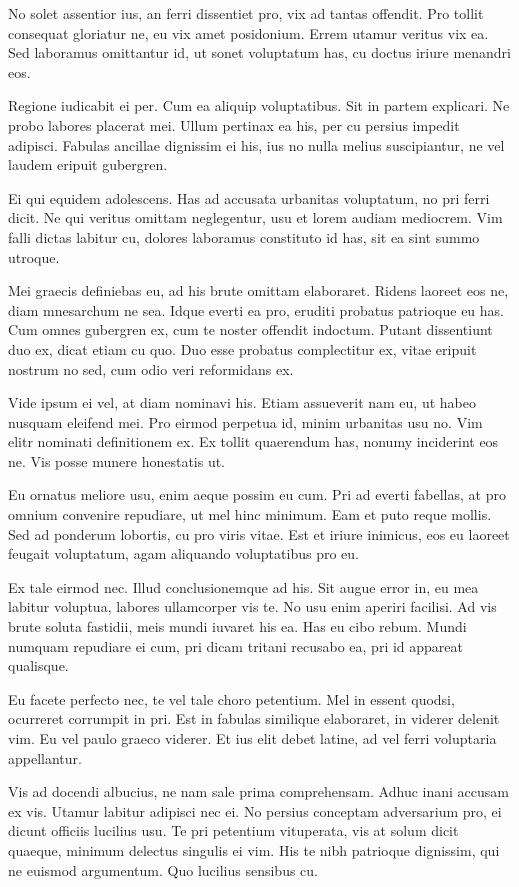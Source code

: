 No solet assentior ius, an ferri dissentiet pro, vix ad tantas offendit. Pro tollit consequat gloriatur ne, eu vix amet posidonium. Errem utamur veritus vix ea. Sed laboramus omittantur id, ut sonet voluptatum has, cu doctus iriure menandri eos.

Regione iudicabit ei per. Cum ea aliquip voluptatibus. Sit in partem explicari. Ne probo labores placerat mei. Ullum pertinax ea his, per cu persius impedit adipisci. Fabulas ancillae dignissim ei his, ius no nulla melius suscipiantur, ne vel laudem eripuit gubergren.

Ei qui equidem adolescens. Has ad accusata urbanitas voluptatum, no pri ferri dicit. Ne qui veritus omittam neglegentur, usu et lorem audiam mediocrem. Vim falli dictas labitur cu, dolores laboramus constituto id has, sit ea sint summo utroque.

Mei graecis definiebas eu, ad his brute omittam elaboraret. Ridens laoreet eos ne, diam mnesarchum ne sea. Idque everti ea pro, eruditi probatus patrioque eu has. Cum omnes gubergren ex, cum te noster offendit indoctum. Putant dissentiunt duo ex, dicat etiam cu quo. Duo esse probatus complectitur ex, vitae eripuit nostrum no sed, cum odio veri reformidans ex.

Vide ipsum ei vel, at diam nominavi his. Etiam assueverit nam eu, ut habeo nusquam eleifend mei. Pro eirmod perpetua id, minim urbanitas usu no. Vim elitr nominati definitionem ex. Ex tollit quaerendum has, nonumy inciderint eos ne. Vis posse munere honestatis ut.

Eu ornatus meliore usu, enim aeque possim eu cum. Pri ad everti fabellas, at pro omnium convenire repudiare, ut mel hinc minimum. Eam et puto reque mollis. Sed ad ponderum lobortis, cu pro viris vitae. Est et iriure inimicus, eos eu laoreet feugait voluptatum, agam aliquando voluptatibus pro eu.

Ex tale eirmod nec. Illud conclusionemque ad his. Sit augue error in, eu mea labitur voluptua, labores ullamcorper vis te. No usu enim aperiri facilisi. Ad vis brute soluta fastidii, meis mundi iuvaret his ea. Has eu cibo rebum. Mundi numquam repudiare ei cum, pri dicam tritani recusabo ea, pri id appareat qualisque.

Eu facete perfecto nec, te vel tale choro petentium. Mel in essent quodsi, ocurreret corrumpit in pri. Est in fabulas similique elaboraret, in viderer delenit vim. Eu vel paulo graeco viderer. Et ius elit debet latine, ad vel ferri voluptaria appellantur.

Vis ad docendi albucius, ne nam sale prima comprehensam. Adhuc inani accusam ex vis. Utamur labitur adipisci nec ei. No persius conceptam adversarium pro, ei dicunt officiis lucilius usu. Te pri petentium vituperata, vis at solum dicit quaeque, minimum delectus singulis ei vim. His te nibh patrioque dignissim, qui ne euismod argumentum. Quo lucilius sensibus cu.

